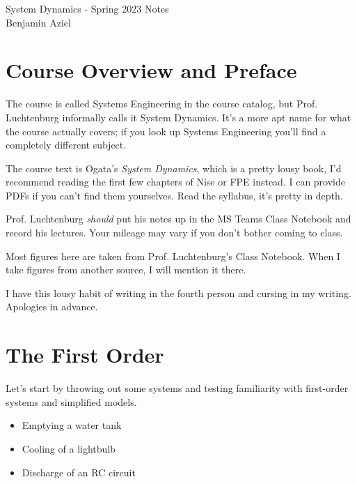 \documentclass{article}
\begin{document}
\begin{onehalfspacing}

\begin{flushleft}

\thispagestyle{empty}
\LARGE{System Dynamics - Spring 2023 Notes} \\
\medskip
\large{Benjamin Aziel}
\normalsize

\tableofcontents

\pagebreak

\section{Course Overview and Preface}

The course is called Systems Engineering in the course catalog, but Prof. Luchtenburg informally calls it System Dynamics. It's a more apt name for what the course actually covers; if you look up Systems Engineering you'll find a completely different subject.

\medskip

The course text is Ogata's \textit{System Dynamics}, which is a pretty lousy book, I'd recommend reading the first few chapters of Nise or FPE instead. I can provide PDFs if you can't find them yourselves. Read the syllabus, it's pretty in depth.

\medskip

Prof. Luchtenburg \textit{should} put his notes up in the MS Teams Class Notebook and record his lectures. Your mileage may vary if you don't bother coming to class.

\medskip

Most figures here are taken from Prof. Luchtenburg's Class Notebook. When I take figures from another source, I will mention it there.

\medskip

I have this lousy habit of writing in the fourth person and cursing in my writing. Apologies in advance.

\section{The First Order}

Let's start by throwing out some systems and testing familiarity with first-order systems and simplified models.
\begin{itemize}[noitemsep,topsep=0.5pt]
    \item Emptying a water tank
    \item Cooling of a lightbulb
    \item Discharge of an RC circuit
\end{itemize}


\end{flushleft}
\end{onehalfspacing}
\end{document}
